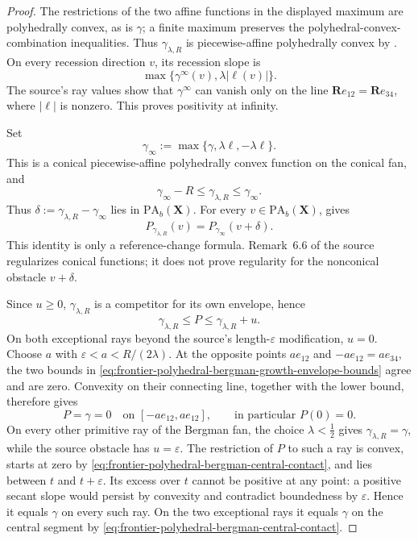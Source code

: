 \begin{proof}
The restrictions of the two affine functions in the displayed maximum are
polyhedrally convex, as is \(\gamma\); a finite maximum preserves the
polyhedral-convex-combination inequalities.  Thus
\(\gamma_{\lambda,R}\) is piecewise-affine polyhedrally convex by
\cite[Definitions~3.1 and~3.3 and Lemma~3.4]{BMPS26}.  On every recession
direction \(v\), its recession slope is
\[
 \max\{\gamma^{\infty}(v),\lambda|\ell(v)|\}.
\]
The source's ray values show that \(\gamma^{\infty}\) can vanish only on
the line \(\mathbf R e_{12}=\mathbf R e_{34}\), where
\(|\ell|\) is nonzero.  This proves positivity at infinity.

Set
\[
 \gamma_{\infty}:=\max\{\gamma,\lambda\ell,-\lambda\ell\}.
\]
This is a conical piecewise-affine polyhedrally convex function on the
conical fan, and
\[
 \gamma_{\infty}-R\leq\gamma_{\lambda,R}\leq\gamma_{\infty}.
 \tag{\(\dagger\)}\label{eq:frontier-polyhedral-bergman-bounded-reference-shift}
\]
Thus \(\delta:=\gamma_{\lambda,R}-\gamma_{\infty}\) lies in
\(\mathrm{PA}_{b}(\mathbf X)\).  For every
\(v\in\mathrm{PA}_{b}(\mathbf X)\),
 gives
\[
 P_{\gamma_{\lambda,R}}(v)
   =P_{\gamma_{\infty}}(v+\delta).
 \tag{\(\ddagger\)}\label{eq:frontier-polyhedral-bergman-envelope-shift}
\]
This identity is only a reference-change formula.  Remark~6.6 of the source
regularizes conical functions; it does not prove regularity for the
nonconical obstacle \(v+\delta\).

Since \(u\geq0\), \(\gamma_{\lambda,R}\) is a competitor for its own
envelope, hence
\[
 \gamma_{\lambda,R}\leq P\leq\gamma_{\lambda,R}+u.
 \tag{\(*\)}\label{eq:frontier-polyhedral-bergman-growth-envelope-bounds}
\]
On both exceptional rays beyond the source's length-\(\varepsilon\)
modification, \(u=0\).  Choose
\(a\) with \(\varepsilon<a<R/(2\lambda)\).  At the opposite points
\(ae_{12}\) and \(-ae_{12}=ae_{34}\), the two bounds in
\eqref{eq:frontier-polyhedral-bergman-growth-envelope-bounds} agree and
are zero.  Convexity on their connecting line, together with the lower
bound, therefore gives
\[
 P=\gamma=0
 \quad\text{on }[-ae_{12},ae_{12}],
 \qquad\text{in particular }P(0)=0.
 \tag{\(**\)}\label{eq:frontier-polyhedral-bergman-central-contact}
\]
On every other primitive ray of the Bergman fan, the choice
\(\lambda<\tfrac12\) gives
\(\gamma_{\lambda,R}=\gamma\), while the source obstacle has
\(u=\varepsilon\).  The restriction of \(P\) to such a ray is convex,
starts at zero by \eqref{eq:frontier-polyhedral-bergman-central-contact},
and lies between \(t\) and \(t+\varepsilon\).  Its excess over \(t\)
cannot be positive at any point: a positive secant slope would persist by
convexity and contradict boundedness by \(\varepsilon\).  Hence it equals
\(\gamma\) on every such ray.  On the two exceptional rays it equals
\(\gamma\) on the central segment by
\eqref{eq:frontier-polyhedral-bergman-central-contact}.


\end{proof}
